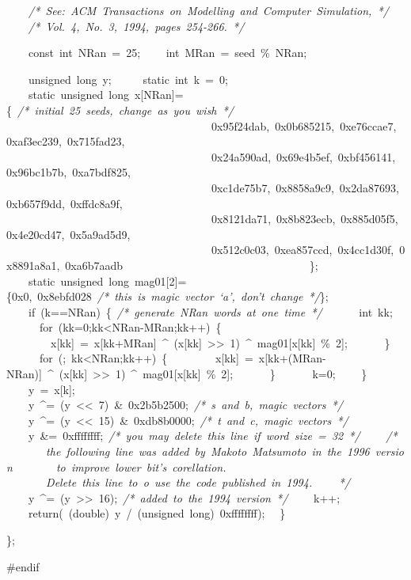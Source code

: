 {\ \ \ \ \textsl{/*\ See:\ ACM\ Transactions\ on\ Modelling\ and\ Computer\ Simulation,\ */}
\ \ \ \ \textsl{/*\ Vol.\ 4,\ No.\ 3,\ 1994,\ pages\ 254-{}266.\ */}

\ \ \ \ const\ int\ NRan\ =\ 25;
\ \ \ \ int\ MRan\ =\ seed\ \%\ NRan;

\ \ \ \ unsigned\ long\ y;
\ \ \ \ \ static\ int\ k\ =\ 0;
\ \ \ \ static\ unsigned\ long\ x[NRan]=\{\ \textsl{/*\ initial\ 25\ seeds,\ change\ as\ you\ wish\ */}
\ \ \ \ \ \ \ \ \ \ \ \ \ \ \ \ \ \ \ \ \ \ \ \ \ \ \ \ \ \ \ \ \ \ \ \ \ 0x95f24dab,\ 0x0b685215,\ 0xe76ccae7,\ 0xaf3ec239,\ 0x715fad23,
\ \ \ \ \ \ \ \ \ \ \ \ \ \ \ \ \ \ \ \ \ \ \ \ \ \ \ \ \ \ \ \ \ \ \ \ \ 0x24a590ad,\ 0x69e4b5ef,\ 0xbf456141,\ 0x96bc1b7b,\ 0xa7bdf825,
\ \ \ \ \ \ \ \ \ \ \ \ \ \ \ \ \ \ \ \ \ \ \ \ \ \ \ \ \ \ \ \ \ \ \ \ \ 0xc1de75b7,\ 0x8858a9c9,\ 0x2da87693,\ 0xb657f9dd,\ 0xffdc8a9f,
\ \ \ \ \ \ \ \ \ \ \ \ \ \ \ \ \ \ \ \ \ \ \ \ \ \ \ \ \ \ \ \ \ \ \ \ \ 0x8121da71,\ 0x8b823ecb,\ 0x885d05f5,\ 0x4e20cd47,\ 0x5a9ad5d9,
\ \ \ \ \ \ \ \ \ \ \ \ \ \ \ \ \ \ \ \ \ \ \ \ \ \ \ \ \ \ \ \ \ \ \ \ \ 0x512c0c03,\ 0xea857ccd,\ 0x4cc1d30f,\ 0x8891a8a1,\ 0xa6b7aadb
\ \ \ \ \ \ \ \ \ \ \ \ \ \ \ \ \ \ \ \ \ \ \ \ \ \ \ \ \ \ \ \ \ \};
\ \ \ \ static\ unsigned\ long\ mag01[2]=\{0x0,\ 0x8ebfd028\ \textsl{/*\ this\ is\ magic\ vector\ `a',\ don't\ change\ */}\};
\ \ \ \ if\ (k==NRan)\ \{\ \textsl{/*\ generate\ NRan\ words\ at\ one\ time\ */}
\ \ \ \ \ \ int\ kk;
\ \ \ \ \ \ for\ (kk=0;kk<{}NRan-{}MRan;kk++)\ \{
\ \ \ \ \ \ \ \ x[kk]\ =\ x[kk+MRan]\ \textasciicircum \ (x[kk]\ >{}>{}\ 1)\ \textasciicircum \ mag01[x[kk]\ \%\ 2];
\ \ \ \ \ \ \}
\ \ \ \ \ \ for\ (;\ kk<{}NRan;kk++)\ \{
\ \ \ \ \ \ \ \ x[kk]\ =\ x[kk+(MRan-{}NRan)]\ \textasciicircum \ (x[kk]\ >{}>{}\ 1)\ \textasciicircum \ mag01[x[kk]\ \%\ 2];
\ \ \ \ \ \ \}
\ \ \ \ \ \ k=0;
\ \ \ \ \}
\ \ \ \ y\ =\ x[k];
\ \ \ \ y\ \textasciicircum =\ (y\ <{}<{}\ 7)\ \&\ 0x2b5b2500;\ \textsl{/*\ s\ and\ b,\ magic\ vectors\ */}
\ \ \ \ y\ \textasciicircum =\ (y\ <{}<{}\ 15)\ \&\ 0xdb8b0000;\ \textsl{/*\ t\ and\ c,\ magic\ vectors\ */}
\ \ \ \ y\ \&=\ 0xffffffff;\ \textsl{/*\ you\ may\ delete\ this\ line\ if\ word\ size\ =\ 32\ */}
\ \ \ \ \textsl{/*
\ \ \ \ \ \ \ the\ following\ line\ was\ added\ by\ Makoto\ Matsumoto\ in\ the\ 1996\ version
\ \ \ \ \ \ \ to\ improve\ lower\ bit's\ corellation.
\ \ \ \ \ \ \ Delete\ this\ line\ to\ o\ use\ the\ code\ published\ in\ 1994.
\ \ \ \ */}
\ \ \ \ y\ \textasciicircum =\ (y\ >{}>{}\ 16);\ \textsl{/*\ added\ to\ the\ 1994\ version\ */}
\ \ \ \ k++;
\ \ \ \ return(\ (double)\ y\ /\ (unsigned\ long)\ 0xffffffff);
\ \ \}

\};

\#endif


 }
\normalfont\normalsize

